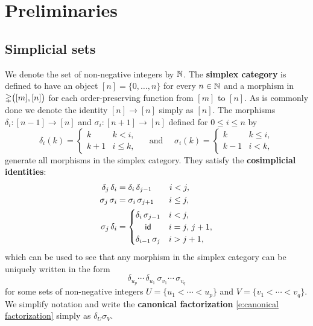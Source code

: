 
\section{Preliminaries} \label{s:preliminaries}


\subsection{Simplicial sets}

We denote the set of non-negative integers by $\mathbb{N}$.
The \textbf{simplex category} is defined to have an object $[n] = \{0, \dots, n\}$ for every $n \in \mathbb{N}$ and a morphism in $\mathbb{\Delta} \big([m], [n] \big)$ for each order-preserving function from $[m]$ to $[n]$.
As is commonly done we denote the identity $[n] \to [n]$ simply as $[n]$.
The morphisms $\delta_i \colon [n-1] \to [n]$ and $\sigma_i \colon [n+1] \to [n]$ defined for $0 \leq i \leq n$ by
\[
\delta_i(k) =
\begin{cases} k & k < i, \\ k+1 & i \leq k, \end{cases}
\quad \text{ and } \quad
\sigma_i(k) =
\begin{cases} k & k \leq i, \\ k-1 & i < k, \end{cases}
\]
generate all morphisms in the simplex category.
They satisfy the \textbf{cosimplicial identities}:
\begin{equation} \label{e:cosimplicial identities}
\begin{split}
\delta_j \, \delta_i &=
\delta_i \, \delta_{j-1} \hspace*{20.9pt} i < j, \\
\sigma_j \, \sigma_i &=
\sigma_i \, \sigma_{j+1} \hspace*{17.9pt} i \leq j, \\
\sigma_j \, \delta_i &=
\begin{cases}
\delta_i \, \sigma_{j-1} & i < j, \\
\hfil \id & i = j,\, j+1, \\
\delta_{i-1} \, \sigma_{j} & i > j + 1,
\end{cases}
\end{split}
\end{equation}
which can be used to see that any morphism in the simplex category can be uniquely written in the form
\begin{equation} \label{e:canonical factorization}
\delta_{u_{p}} \cdots\, \delta_{u_1}\, \sigma_{v_1} \cdots\, \sigma_{v_q}
\end{equation}
for some sets of non-negative integers $U = \{u_1 < \cdots < u_{p}\}$ and $V = \{v_1 < \cdots < v_{q}\}$.
We simplify notation and write the \textbf{canonical factorization} \eqref{e:canonical factorization} simply as $\delta_U \sigma_V$.

